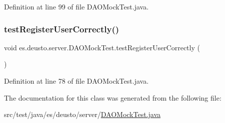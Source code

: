 Definition at line 99 of file D\+A\+O\+Mock\+Test.\+java.

\mbox{\label{classes_1_1deusto_1_1server_1_1_d_a_o_mock_test_a130e22cffc04eaf64f676f3bd990842e}} 
\subsubsection{\texorpdfstring{test\+Register\+User\+Correctly()}{testRegisterUserCorrectly()}}
{\footnotesize\ttfamily void es.\+deusto.\+server.\+D\+A\+O\+Mock\+Test.\+test\+Register\+User\+Correctly (\begin{DoxyParamCaption}{ }\end{DoxyParamCaption})}



Definition at line 78 of file D\+A\+O\+Mock\+Test.\+java.



The documentation for this class was generated from the following file\+:\begin{DoxyCompactItemize}
\item 
src/test/java/es/deusto/server/\hyperlink{_d_a_o_mock_test_8java}{D\+A\+O\+Mock\+Test.\+java}\end{DoxyCompactItemize}
